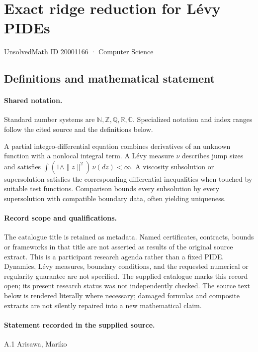 \documentclass[11pt]{article}
\begin{document}
\setcounter{section}{20001165}
\section{Exact ridge reduction for Lévy PIDEs}\label{20001166}
{\small\sffamily UnsolvedMath ID 20001166 · Computer Science}
\subsection{Definitions and mathematical statement}

\paragraph{Shared notation.}Standard number systems are $\mathbb N,\mathbb Z,\mathbb Q,\mathbb R,\mathbb C$. Specialized notation and index ranges follow the cited source and the definitions below.


A partial integro-differential equation combines derivatives of an unknown function with a nonlocal integral term. A Lévy measure $\nu$ describes jump sizes and satisfies $\int(1\wedge\|z\|^2)\,\nu(dz)<\infty$. A viscosity subsolution or supersolution satisfies the corresponding differential inequalities when touched by suitable test functions. Comparison bounds every subsolution by every supersolution with compatible boundary data, often yielding uniqueness.
\paragraph{Record scope and qualifications.}
The catalogue title is retained as metadata. Named certificates, contracts, bounds or frameworks in that title are not asserted as results of the original source extract.
This is a participant research agenda rather than a fixed PIDE. Dynamics, Lévy measures, boundary conditions, and the requested numerical or regularity guarantee are not specified. The supplied catalogue marks this record open; its present research status was not independently checked.
The source text below is rendered literally where necessary; damaged formulas and composite extracts are not silently repaired into a new mathematical claim.
\paragraph{Statement recorded in the supplied source.}
A.1 Arisawa, Mariko
\end{document}
